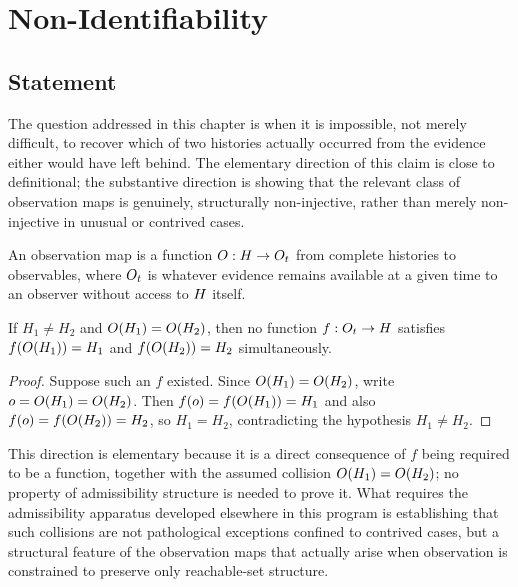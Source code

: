 \chapter{Non-Identifiability}
\label{ch:nonidentifiability}

\section{Statement}

The question addressed in this chapter is when it is impossible, not
merely difficult, to recover which of two histories actually occurred
from the evidence either would have left behind. The elementary
direction of this claim is close to definitional; the substantive
direction is showing that the relevant class of observation maps is
genuinely, structurally non-injective, rather than merely
non-injective in unusual or contrived cases.

\begin{definition}
An observation map is a function $O : H \to O_t$
from complete histories to observables, where $O_t$ is whatever
evidence remains available at a given time to an observer without
access to $H$ itself.
\end{definition}

\begin{theorem}
\label{thm:nonident-elementary}
If $H_1 \neq H_2$ and $O(H_1) = O(H_2)$, then no function
$f : O_t \to H$ satisfies $f(O(H_1)) = H_1$ and
$f(O(H_2)) = H_2$ simultaneously.
\end{theorem}

\begin{proof}
Suppose such an $f$ existed. Since $O(H_1) = O(H_2)$, write
$o = O(H_1) = O(H_2)$. Then $f(o) = f(O(H_1)) = H_1$
and also $f(o) = f(O(H_2)) = H_2$, so $H_1 = H_2$, contradicting
the hypothesis $H_1 \neq H_2$.
\end{proof}

This direction is elementary because it is a direct consequence of $f$
being required to be a function, together with the assumed collision
$O(H_1) = O(H_2)$; no property of admissibility structure is
needed to prove it. What requires the admissibility apparatus developed
elsewhere in this program is establishing that such collisions are not
pathological exceptions confined to contrived cases, but a structural
feature of the observation maps that actually arise when observation is
constrained to preserve only reachable-set structure.

